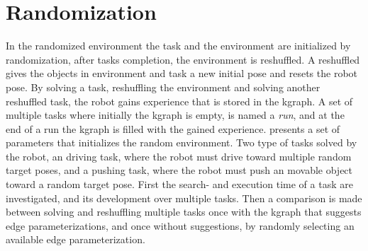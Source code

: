 %
%
%
%

\section{Randomization}%
\label{sec:randomization}
In the randomized environment the task and the environment are initialized by randomization, after tasks completion, the environment is reshuffled. A reshuffled gives the objects in environment and task a new initial pose and resets the robot pose. By solving a task, reshuffling the environment and solving another reshuffled task, the robot gains experience that is stored in the \ac{kgraph}. A set of multiple tasks where initially the \ac{kgraph} is empty, is named a \textit{run}, and at the end of a run the \ac{kgraph} is filled with the gained experience.  presents a set of parameters that initializes the random environment. Two type of tasks solved by the robot, an driving task, where the robot must drive toward multiple random target poses, and a pushing task, where the robot must push an movable object toward a random target pose. First the search- and execution time of a task are investigated, and its development over multiple tasks. Then a comparison is made between solving and reshuffling multiple tasks once with the \ac{kgraph} that suggests edge parameterizations, and once without suggestions, by randomly selecting an available edge parameterization.\bs


